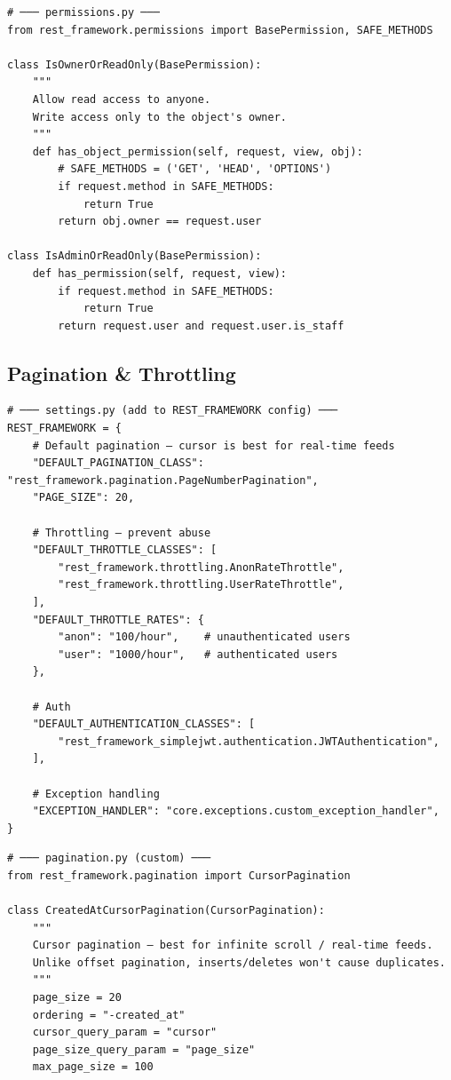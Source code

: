 \documentclass[10pt, a4paper]{article}
\begin{document}
\begin{lstlisting}[language=mypython]
# ─── permissions.py ───
from rest_framework.permissions import BasePermission, SAFE_METHODS

class IsOwnerOrReadOnly(BasePermission):
    """
    Allow read access to anyone.
    Write access only to the object's owner.
    """
    def has_object_permission(self, request, view, obj):
        # SAFE_METHODS = ('GET', 'HEAD', 'OPTIONS')
        if request.method in SAFE_METHODS:
            return True
        return obj.owner == request.user

class IsAdminOrReadOnly(BasePermission):
    def has_permission(self, request, view):
        if request.method in SAFE_METHODS:
            return True
        return request.user and request.user.is_staff
\end{lstlisting}


\subsection{Pagination \& Throttling}


\begin{lstlisting}[language=mypython]
# ─── settings.py (add to REST_FRAMEWORK config) ───
REST_FRAMEWORK = {
    # Default pagination — cursor is best for real-time feeds
    "DEFAULT_PAGINATION_CLASS": "rest_framework.pagination.PageNumberPagination",
    "PAGE_SIZE": 20,
    
    # Throttling — prevent abuse
    "DEFAULT_THROTTLE_CLASSES": [
        "rest_framework.throttling.AnonRateThrottle",
        "rest_framework.throttling.UserRateThrottle",
    ],
    "DEFAULT_THROTTLE_RATES": {
        "anon": "100/hour",    # unauthenticated users
        "user": "1000/hour",   # authenticated users
    },
    
    # Auth
    "DEFAULT_AUTHENTICATION_CLASSES": [
        "rest_framework_simplejwt.authentication.JWTAuthentication",
    ],
    
    # Exception handling
    "EXCEPTION_HANDLER": "core.exceptions.custom_exception_handler",
}
\end{lstlisting}


\begin{lstlisting}[language=mypython]
# ─── pagination.py (custom) ───
from rest_framework.pagination import CursorPagination

class CreatedAtCursorPagination(CursorPagination):
    """
    Cursor pagination — best for infinite scroll / real-time feeds.
    Unlike offset pagination, inserts/deletes won't cause duplicates.
    """
    page_size = 20
    ordering = "-created_at"
    cursor_query_param = "cursor"
    page_size_query_param = "page_size"
    max_page_size = 100
\end{lstlisting}
\end{document}
